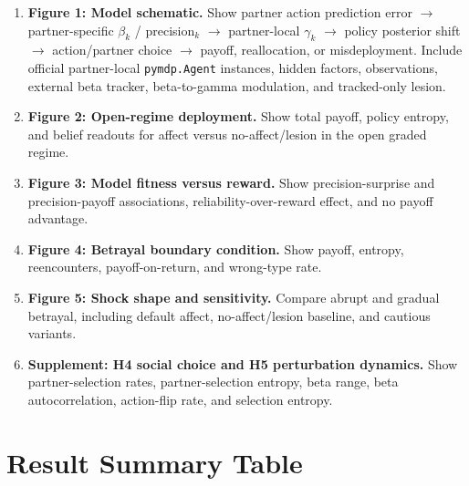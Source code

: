 \begin{enumerate}
  \item \textbf{Figure 1: Model schematic.} Show partner action prediction error $\rightarrow$ partner-specific $\beta_k$ / precision$_k$ $\rightarrow$ partner-local $\gamma_k$ $\rightarrow$ policy posterior shift $\rightarrow$ action/partner choice $\rightarrow$ payoff, reallocation, or misdeployment. Include official partner-local \texttt{pymdp.Agent} instances, hidden factors, observations, external beta tracker, beta-to-gamma modulation, and tracked-only lesion.
  \item \textbf{Figure 2: Open-regime deployment.} Show total payoff, policy entropy, and belief readouts for affect versus no-affect/lesion in the open graded regime.
  \item \textbf{Figure 3: Model fitness versus reward.} Show precision-surprise and precision-payoff associations, reliability-over-reward effect, and no payoff advantage.
  \item \textbf{Figure 4: Betrayal boundary condition.} Show payoff, entropy, reencounters, payoff-on-return, and wrong-type rate.
  \item \textbf{Figure 5: Shock shape and sensitivity.} Compare abrupt and gradual betrayal, including default affect, no-affect/lesion baseline, and cautious variants.
  \item \textbf{Supplement: H4 social choice and H5 perturbation dynamics.} Show partner-selection rates, partner-selection entropy, beta range, beta autocorrelation, action-flip rate, and selection entropy.
\end{enumerate}

\section{Result Summary Table}


